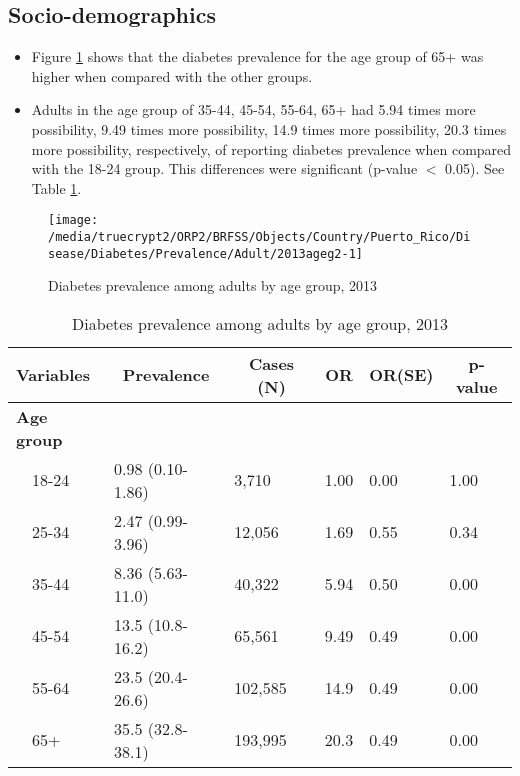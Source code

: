 \newpage
\subsection{Socio-demographics}

\begin{itemize}

\item Figure \ref{fig:age.Diabetes.2013} shows that the diabetes prevalence for the age group of
65+
was higher when compared with the other groups.

\item Adults in the age group of 35-44, 45-54, 55-64, 65+ had 5.94 times more possibility, 9.49 times more possibility, 14.9 times more possibility, 20.3 times more possibility, respectively, of reporting diabetes prevalence when compared with the 18-24 group. This differences were significant (p-value $<$ 0.05). See Table \ref{tab:age.Diabetes.2013}.


\end{itemize}


\begin{figure}[H]
\caption{Diabetes prevalence among adults by age group, 
2013}
\begin{knitrout}
\color{fgcolor}

{\centering \texttt{[image: /media/truecrypt2/ORP2/BRFSS/Objects/Country/Puerto\_Rico/Disease/Diabetes/Prevalence/Adult/2013ageg2-1]} 

}



\end{knitrout}
\label{fig:age.Diabetes.2013}
\end{figure}

\begin{table}[H]
\caption{Diabetes prevalence  among adults by age group, 2013\label{tab:age.Diabetes.2013}} 
\begin{center}
\begin{tabular}{llllll}
\hline\hline
\multicolumn{1}{l}{Variables}&\multicolumn{1}{c}{Prevalence}&\multicolumn{1}{c}{Cases (N)}&\multicolumn{1}{c}{OR}&\multicolumn{1}{c}{OR(SE)}&\multicolumn{1}{c}{p-value}\tabularnewline
\hline
{\bfseries Age group}&&&&&\tabularnewline
~~18-24&0.98 (0.10-1.86)&  3,710&1.00&0.00&1.00\tabularnewline
~~25-34&2.47 (0.99-3.96)& 12,056&1.69&0.55&0.34\tabularnewline
~~35-44&8.36 (5.63-11.0)& 40,322&5.94&0.50&0.00\tabularnewline
~~45-54&13.5 (10.8-16.2)& 65,561&9.49&0.49&0.00\tabularnewline
~~55-64&23.5 (20.4-26.6)&102,585&14.9&0.49&0.00\tabularnewline
~~65+&35.5 (32.8-38.1)&193,995&20.3&0.49&0.00\tabularnewline
\hline
\end{tabular}\end{center}

\end{table}


